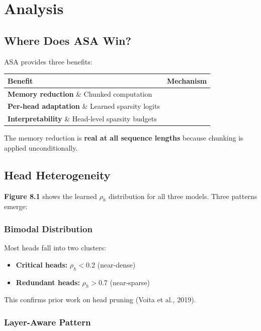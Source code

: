 
\section{Analysis}

\subsection{Where Does ASA Win?}

ASA provides three benefits:

\begin{table}[H]
\centering
\small
\begin{tabular}{ll}
\toprule
\textbf{Benefit} & \textbf{Mechanism} \\
\midrule
\textbf{Memory reduction} \& Chunked computation \\
\textbf{Per-head adaptation} \& Learned sparsity logits \\
\textbf{Interpretability} \& Head-level sparsity budgets \\
\bottomrule
\end{tabular}
\end{table}

The memory reduction is \textbf{real at all sequence lengths} because chunking 
is applied unconditionally.

\subsection{Head Heterogeneity}

\textbf{Figure 8.1} shows the learned $\rho_h$ distribution for all three models. 
Three patterns emerge:

\subsubsection{Bimodal Distribution}

Most heads fall into two clusters:

\begin{itemize}
\item \textbf{Critical heads:} $\rho_h < 0.2$ (near-dense)
\item \textbf{Redundant heads:} $\rho_h > 0.7$ (near-sparse)

\end{itemize}
This confirms prior work on head pruning (Voita et al., 2019).

\subsubsection{Layer-Aware Pattern}

